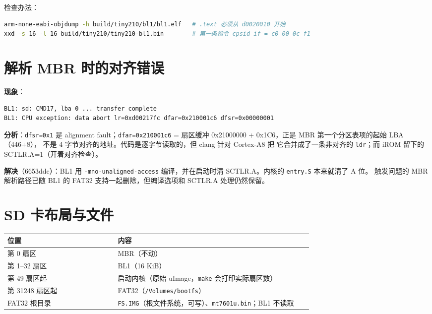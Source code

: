 检查办法：

\begin{lstlisting}[language=sh]
arm-none-eabi-objdump -h build/tiny210/bl1/bl1.elf   # .text 必须从 d0020010 开始
xxd -s 16 -l 16 build/tiny210/tiny210-bl1.bin        # 第一条指令 cpsid if = c0 00 0c f1
\end{lstlisting}

\section{解析 MBR
时的对齐错误}\label{ux89e3ux6790-mbr-ux65f6ux7684ux5bf9ux9f50ux9519ux8bef}

\textbf{现象}：

\begin{lstlisting}
BL1: sd: CMD17, lba 0 ... transfer complete
BL1: CPU exception: data abort lr=0xd00217fc dfar=0x210001c6 dfsr=0x00000001
\end{lstlisting}

\textbf{分析}：\passthrough{\lstinline!dfsr=0x1!} 是 alignment
fault；\passthrough{\lstinline!dfar=0x210001c6!} = 扇区缓冲 0x21000000 +
0x1C6，正是 MBR 第一个分区表项的起始 LBA（446+8）， 不是 4
字节对齐的地址。代码是逐字节读取的，但 clang 针对 Cortex-A8 把
它合并成了一条非对齐的 \passthrough{\lstinline!ldr!}；而 iROM 留下的
SCTLR.A=1（开着对齐检查）。

\textbf{解决}（6653ddc）：BL1 用
\passthrough{\lstinline!-mno-unaligned-access!} 编译，并在启动时清
SCTLR.A。内核的 \passthrough{\lstinline!entry.S!} 本来就清了 A 位。
触发问题的 MBR 解析路径已随 BL1 的 FAT32 支持一起删除，但编译选项和
SCTLR.A 处理仍然保留。

\section{SD 卡布局与文件}\label{sd-ux5361ux5e03ux5c40ux4e0eux6587ux4ef6}

{\def\LTcaptype{none} %
\begin{longtable}[]{@{}p{0.34\linewidth}p{0.60\linewidth}@{}}
\toprule\noalign{}
位置 & 内容 \\
\midrule\noalign{}
\endhead
\bottomrule\noalign{}
\endlastfoot
第 0 扇区 & MBR（不动） \\
第 1--32 扇区 & BL1（16 KiB） \\
第 49 扇区起 & 启动内核（原始 uImage，\passthrough{\lstinline!make!}
会打印实际扇区数） \\
第 31248 扇区起 & FAT32（\passthrough{\lstinline!/Volumes/bootfs!}） \\
FAT32 根目录 &
\passthrough{\lstinline!FS.IMG!}（根文件系统，可写）、\passthrough{\lstinline!mt7601u.bin!}；BL1 不读取 \\
\end{longtable}
}

